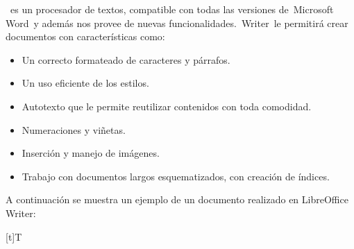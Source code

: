 \documentclass[letterpaper,10pt,spanish]{sphinxmanual}
\let\sphinxpxdimen\pdfpxdimen\else\newdimen\sphinxpxdimen
\begin{document}
\sphinxAtStartPar
{} es un procesador de textos, compatible con todas las versiones de Microsoft Word y además nos provee de nuevas funcionalidades. Writer le permitirá crear documentos con características como:
\begin{itemize}
\item {} 
\sphinxAtStartPar
Un correcto formateado de caracteres y párrafos.

\item {} 
\sphinxAtStartPar
Un uso eficiente de los estilos.

\item {} 
\sphinxAtStartPar
Auto\sphinxhyphen{}texto que le permite reutilizar contenidos con toda comodidad.

\item {} 
\sphinxAtStartPar
Numeraciones y viñetas.

\item {} 
\sphinxAtStartPar
Inserción y manejo de imágenes.

\item {} 
\sphinxAtStartPar
Trabajo con documentos largos esquematizados, con creación de índices.

\end{itemize}

\sphinxAtStartPar
A continuación se muestra un ejemplo de un documento realizado en LibreOffice Writer:


\begin{savenotes}\sphinxattablestart
\sphinxthistablewithglobalstyle
\centering
\begin{tabulary}{\linewidth}[t]{T}
\sphinxtoprule
\sphinxtableatstartofbodyhook

\begin{sphinxfigure-in-table}
\centering
\capstart
\noindent\sphinxincludegraphics[width=600\sphinxpxdimen]{{image025}.png}
\label{\detokenize{1_guias/10ofimatica/G1013:id2}}\end{sphinxfigure-in-table}\relax
\\
\sphinxbottomrule
\end{tabulary}
\sphinxtableafterendhook\par
\sphinxattableend\end{savenotes}
\end{document}
